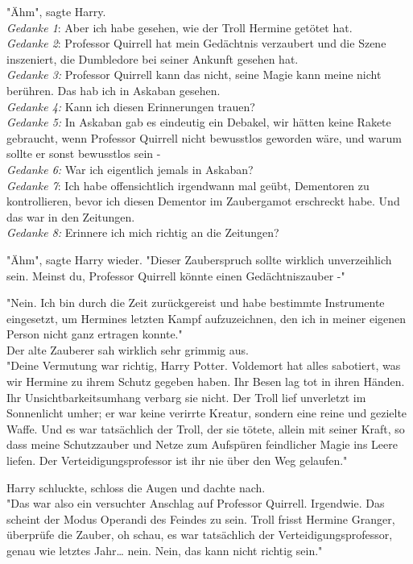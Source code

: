 {"Ähm", sagte Harry.\\ \emph{Gedanke 1}: Aber ich habe gesehen, wie der Troll Hermine getötet hat.\\ \emph{Gedanke 2}: Professor Quirrell hat mein Gedächtnis verzaubert und die Szene inszeniert, die Dumbledore bei seiner Ankunft gesehen hat.\\ \emph{Gedanke 3:} Professor Quirrell kann das nicht, seine Magie kann meine nicht berühren. Das hab ich in Askaban gesehen.\\ \emph{Gedanke 4:} Kann ich diesen Erinnerungen trauen?\\ \emph{Gedanke 5:} In Askaban gab es eindeutig ein Debakel, wir hätten keine Rakete gebraucht, wenn Professor Quirrell nicht bewusstlos geworden wäre, und warum sollte er sonst bewusstlos sein -\\ \emph{Gedanke 6:} War ich eigentlich jemals in Askaban?\\ \emph{Gedanke 7}: Ich habe offensichtlich irgendwann mal geübt, Dementoren zu kontrollieren, bevor ich diesen Dementor im Zaubergamot erschreckt habe. Und das war in den Zeitungen.\\ \emph{Gedanke 8:} Erinnere ich mich richtig an die Zeitungen?

"Ähm", sagte Harry wieder. "Dieser Zauberspruch sollte wirklich unverzeihlich sein. Meinst du, Professor Quirrell könnte einen Gedächtniszauber -"

"Nein. Ich bin durch die Zeit zurückgereist und habe bestimmte Instrumente eingesetzt, um Hermines letzten Kampf aufzuzeichnen, den ich in meiner eigenen Person nicht ganz ertragen konnte."\\ Der alte Zauberer sah wirklich sehr grimmig aus.\\ "Deine Vermutung war richtig, Harry Potter. Voldemort hat alles sabotiert, was wir Hermine zu ihrem Schutz gegeben haben. Ihr Besen lag tot in ihren Händen. Ihr Unsichtbarkeitsumhang verbarg sie nicht. Der Troll lief unverletzt im Sonnenlicht umher; er war keine verirrte Kreatur, sondern eine reine und gezielte Waffe. Und es war tatsächlich der Troll, der sie tötete, allein mit seiner Kraft, so dass meine Schutzzauber und Netze zum Aufspüren feindlicher Magie ins Leere liefen. Der Verteidigungsprofessor ist ihr nie über den Weg gelaufen."

Harry schluckte, schloss die Augen und dachte nach.\\ "Das war also ein versuchter Anschlag auf Professor Quirrell. Irgendwie. Das scheint der Modus Operandi des Feindes zu sein. Troll frisst Hermine Granger, überprüfe die Zauber, oh schau, es war tatsächlich der Verteidigungsprofessor, genau wie letztes Jahr… nein. Nein, das kann nicht richtig sein."

}

